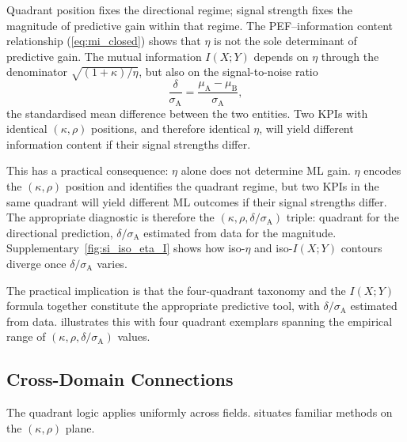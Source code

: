 Quadrant position fixes the directional regime; signal strength fixes the magnitude of predictive gain within that regime. The PEF--information content relationship (\cref{eq:mi_closed}) shows that $\eta$ is not the sole determinant of predictive gain. The mutual information $I(X;Y)$ depends on $\eta$ through the denominator $\sqrt{(1+\kappa)/\eta}$, but also on the signal-to-noise ratio
\begin{equation}
  \frac{\delta}{\sigma_{\mathrm{A}}} = \frac{\mu_{\mathrm{A}} - \mu_{\mathrm{B}}}{\sigma_{\mathrm{A}}},
  \label{eq:delta_ratio}
\end{equation}
the standardised mean difference between the two entities. Two KPIs with identical $(\kappa,\rho)$ positions, and therefore identical $\eta$, will yield different information content if their signal strengths differ.

This has a practical consequence: $\eta$ alone does not determine ML gain. $\eta$ encodes the $(\kappa,\rho)$ position and identifies the quadrant regime, but two KPIs in the same quadrant will yield different ML outcomes if their signal strengths differ. The appropriate diagnostic is therefore the $(\kappa,\rho,\delta/\sigma_{\mathrm{A}})$ triple: quadrant for the directional prediction, $\delta/\sigma_{\mathrm{A}}$ estimated from data for the magnitude. Supplementary~\cref{fig:si_iso_eta_I} shows how iso-$\eta$ and iso-$I(X;Y)$ contours diverge once $\delta/\sigma_{\mathrm{A}}$ varies.

The practical implication is that the four-quadrant taxonomy and the $I(X;Y)$ formula together constitute the appropriate predictive tool, with $\delta/\sigma_{\mathrm{A}}$ estimated from data.  illustrates this with four quadrant exemplars spanning the empirical range of $(\kappa,\rho,\delta/\sigma_{\mathrm{A}})$ values.

\subsection{Cross-Domain Connections}

The quadrant logic applies uniformly across fields.  situates familiar methods on the $(\kappa,\rho)$ plane.

